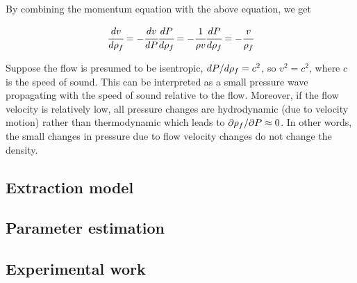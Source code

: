 \documentclass[a4paper,fleqn]{cas-dc}
\begin{document}
By combining the momentum equation with the above equation, we get

{\footnotesize
	\begin{equation} \label{EQ: Pressure_Velocity}
		\cfrac{d v}{d {\color{black}\rho_f}} = - \cfrac{d v}{d{\color{black}P}} \cfrac{d {\color{black}P}}{d {\color{black}\rho_f}} = -\cfrac{1}{\rho v} \cfrac{d{\color{black}P}}{d{\color{black}\rho_f}} = -\cfrac{v}{{\color{black}\rho_f}}
	\end{equation}
}

Suppose the flow is presumed to be isentropic, $d{\color{black}P}/d{\color{black}\rho_f} = c^2$, so $v^2=c^2$, where $c$ is the speed of sound. This can be interpreted as a small pressure wave propagating with the speed of sound relative to the flow. Moreover, if the flow velocity is relatively low, all pressure changes are hydrodynamic (due to velocity motion) rather than thermodynamic which leads to $\partial {\color{black}\rho_f} / \partial {\color{black}P} \approx 0$. In other words, the small changes in pressure due to flow velocity changes do not change the density. %

\subsection{Extraction model} \label{CH: Extraction_model}


%

\subsection{Parameter estimation} \label{CH: Parameter_estimation}


\subsection{Experimental work}

\end{document}
